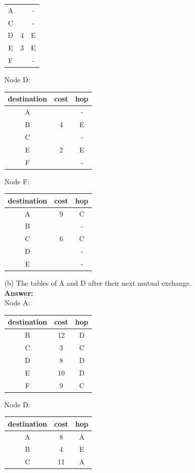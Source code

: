 \documentclass[a4paper]{article}
\begin{document}
\begin{itemize}
\begin{itemize}
\begin{tabular}{c|c|c}
	      	\hline
	      	A &   & - \\
	      	C &   & - \\
	      	D & 4 & E \\
	      	E & 3 & E \\
	      	F &   & - \\
	      	\end{tabular}
	      	Node D: \begin{tabular}{c|c|c}
	      	destination & cost & hop \\
	      	\hline
	      	A &   & - \\
	      	B & 4 & E \\
	      	C &   & - \\
	      	E & 2 & E \\
	      	F &   & - \\
	      	\end{tabular}
	      	Node F: \begin{tabular}{c|c|c}
	      	destination & cost & hop \\
	      	\hline
	      	A & 9 & C \\
	      	B &   & - \\
	      	C & 6 & C \\
	      	D &   & - \\
	      	E &   & - \\
	      	\end{tabular}
	      	\item[(b)] The tables of A and D after their next mutual exchange. \\
	      	      \textbf{Answer:} \\
	      	      Node A: \begin{tabular}{c|c|c}
	      	      destination & cost & hop \\
	      	      \hline
	      	      B & 12 & D \\
	      	      C & 3  & C \\
	      	      D & 8  & D \\
	      	      E & 10 & D \\
	      	      F & 9  & C \\
	      	\end{tabular}
	      	Node D: \begin{tabular}{c|c|c}
	      	destination & cost & hop \\
	      	\hline
	      	A & 8  & A \\
	      	B & 4  & E \\
	      	C & 11 & A \\

\end{tabular}
\end{itemize}
\end{itemize}
\end{document}
